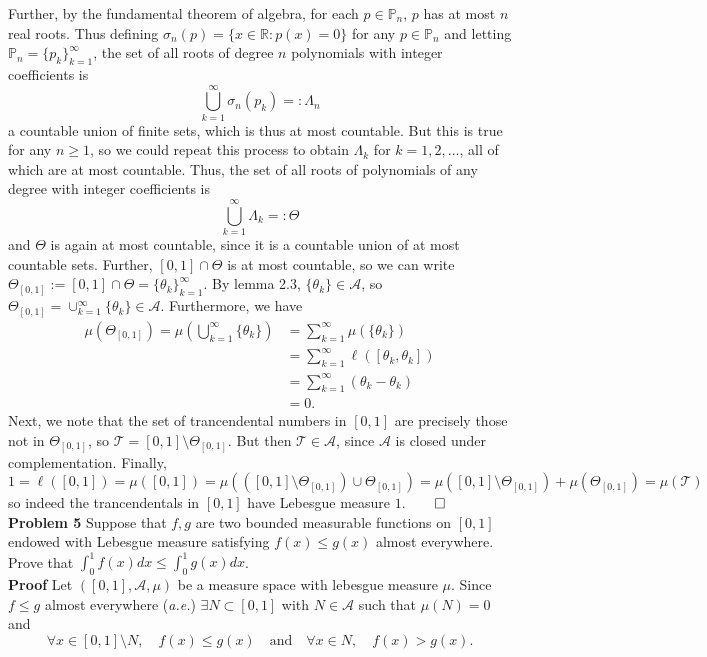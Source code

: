 \documentclass[11pt, letterpaper]{article}
\newcommand{\mbb}[1]{\mathbb{#1}}
\newcommand{\mc}[1]{\mathcal{#1}}
\begin{document}
    Further, by the fundamental theorem of algebra, for each $p\in\mbb{P}_n$, $p$ has at most $n$ real roots. Thus defining $\sigma_n(p)=\{x\in\mbb{R}:p(x)=0\}$ for any $p\in\mbb{P}_n$ and letting $\mbb{P}_n=\{p_k\}_{k=1}^\infty$, the set of all roots of degree $n$ polynomials with integer coefficients is
    \[\bigcup_{k=1}^\infty\sigma_n(p_k)=:\Lambda_n\]
    a countable union of finite sets, which is thus at most countable. But this is true for any $n\geq 1$, so we could repeat this process to obtain $\Lambda_k$ for $k=1,2,\dots$, all of which are at most countable. Thus, the set of all roots of polynomials of any degree with integer coefficients is
    \[\bigcup_{k=1}^\infty\Lambda_k=:\Theta\]
    and $\Theta$ is again at most countable, since it is a countable union of at most countable sets. Further, $[0,1]\cap\Theta$ is at most countable, so we can write $\Theta_{[0,1]}:=[0,1]\cap\Theta=\{\theta_k\}_{k=1}^\infty$. By lemma 2.3, $\{\theta_k\}\in\mc{A}$, so $\Theta_{[0,1]}=\cup_{k=1}^\infty\{\theta_k\}\in\mc{A}$. Furthermore, we have
    \begin{align*}
        \mu(\Theta_{[0,1]})=\mu\left(\bigcup_{k=1}^\infty\{\theta_k\}\right)
        &=\sum_{k=1}^\infty\mu(\{\theta_k\})\tag{countable additivity}\\
        &=\sum_{k=1}^\infty\ell([\theta_k,\theta_k])\tag{definition 2.4}\\
        &=\sum_{k=1}^\infty(\theta_k-\theta_k)\\
        &=0.
    \end{align*}
    Next, we note that the set of trancendental numbers in $[0,1]$ are precisely those not in $\Theta_{[0,1]}$, so $\mc{T}=[0,1]\setminus\Theta_{[0,1]}$. But then $\mc{T}\in\mc{A}$, since $\mc{A}$ is closed under complementation. Finally,
    \[1=\ell([0,1])=\mu([0,1])=\mu(([0,1]\setminus\Theta_{[0,1]})\cup\Theta_{[0,1]})=\mu([0,1]\setminus\Theta_{[0,1]})+\mu(\Theta_{[0,1]})=\mu(\mc{T})\]
    so indeed the trancendentals in $[0,1]$ have Lebesgue measure $1$.\hfill{$\qed$}\\[10pt]
    {\bf Problem 5} Suppose that $f,g$ are two bounded measurable functions on $[0,1]$ endowed with Lebesgue measure satisfying $f(x)\leq g(x)$ almost everywhere.
    Prove that $\int_0^1f(x)dx\leq\int_0^1g(x)dx$.\\[10pt]
    {\bf Proof} Let $([0,1], \mc{A},\mu)$ be a measure space with lebesgue measure $\mu$. Since $f\leq g$ almost everywhere ({\it a.e.}) $\exists N\subset[0,1]$ with $N\in\mc{A}$ such that $\mu(N)=0$ and
    \[\forall x\in [0,1]\setminus N,\quad f(x)\leq g(x)\quad\text{and}\quad \forall x\in N,\quad f(x)> g(x).\]
\end{document}
